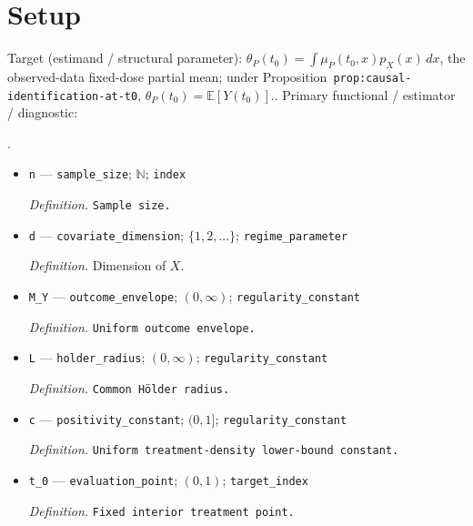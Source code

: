 \documentclass{article}
\begin{document}
\section{Setup}

Target (estimand / structural parameter): \(\theta_P(t_0)=\int\mu_P(t_0,x)p_X(x)\,dx\), the observed-data fixed-dose partial mean; under Proposition~\texttt{prop:causal-identification-at-t0}, \(\theta_P(t_0)=\mathbb E[Y(t_0)]\)..
Primary functional / estimator / diagnostic: \par\noindent {}\par\noindent.
\begin{itemize}
  \item \texttt{n} --- \texttt{sample\_\allowbreak{}size}; \(\mathbb N\); \texttt{index}
  \par\smallskip\noindent\emph{Definition.} \texttt{Sample size.}
  \item \texttt{d} --- \texttt{covariate\_\allowbreak{}dimension}; \(\{1,2,\ldots\}\); \texttt{regime\_\allowbreak{}parameter}
  \par\smallskip\noindent\emph{Definition.} Dimension of \(X\).
  \item \texttt{M\_\allowbreak{}Y} --- \texttt{outcome\_\allowbreak{}envelope}; \((0,\infty)\); \texttt{regularity\_\allowbreak{}constant}
  \par\smallskip\noindent\emph{Definition.} \texttt{Uniform outcome envelope.}
  \item \texttt{L} --- \texttt{holder\_\allowbreak{}radius}; \((0,\infty)\); \texttt{regularity\_\allowbreak{}constant}
  \par\smallskip\noindent\emph{Definition.} \texttt{Common Hölder radius.}
  \item \texttt{c} --- \texttt{positivity\_\allowbreak{}constant}; \((0,1]\); \texttt{regularity\_\allowbreak{}constant}
  \par\smallskip\noindent\emph{Definition.} \texttt{Uniform treatment-\allowbreak{}density lower-\allowbreak{}bound constant.}
  \item \texttt{t\_\allowbreak{}0} --- \texttt{evaluation\_\allowbreak{}point}; \((0,1)\); \texttt{target\_\allowbreak{}index}
  \par\smallskip\noindent\emph{Definition.} \texttt{Fixed interior treatment point.}

\end{itemize}
\end{document}
